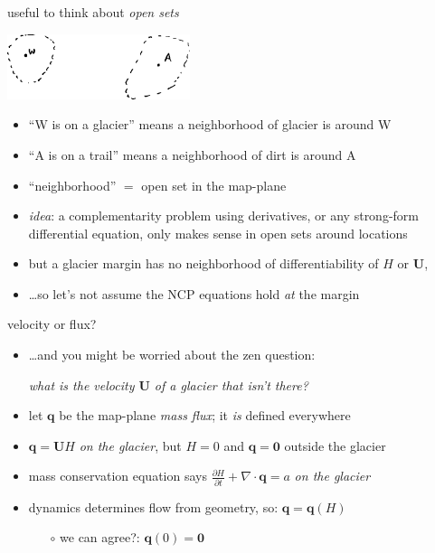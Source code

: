 \documentclass[10pt,hyperref,dvipsnames]{beamer}
\newcommand{\bq}{\mathbf{q}}
\newcommand{\bU}{\mathbf{U}}
\newcommand{\bzero}{\bm{0}}
\newcommand{\Div}{\nabla\cdot}
\begin{document}
\begin{frame}{useful to think about \emph{open sets}}

\begin{center}
\includegraphics[width=0.4\textwidth]{figs/opensets.png}
\end{center}

\begin{itemize}
\item ``W is on a glacier'' means a neighborhood of glacier is around W
\item ``A is on a trail'' means a neighborhood of dirt is around A
\item ``neighborhood'' $=$ open set in the map-plane

\medskip
\item \emph{idea}:  a complementarity problem using derivatives, or any strong-form differential equation, only makes sense in open sets around locations

\medskip
\item but a glacier margin has no neighborhood of differentiability of $H$ or $\bU$,
\item \dots so let's not assume the NCP equations hold \emph{at} the margin
\end{itemize}
\end{frame}


\begin{frame}{velocity or flux?}
\begin{itemize}
\item \dots and you might be worried about the zen question:

\begin{center}
\emph{what is the velocity $\bU$ of a glacier that isn't there?}
\end{center}

\vspace{5mm}
\item<2> let $\bq$ be the map-plane \emph{mass flux}; it \emph{is} defined everywhere

\medskip
\item<2> \alert{$\bq = \bU H$ \emph{on the glacier}, but $H=0$ and $\bq=\bzero$ outside the glacier}

\medskip
\item<2> mass conservation equation says \quad $\frac{\partial H}{\partial t} + \Div \bq = a$ \quad \emph{on the glacier}

\medskip
\item<2> dynamics determines flow from geometry, so: \quad $\bq=\bq(H)$
    \begin{itemize}
    \item[$\circ$] we can agree?: \quad $\bq(0)=\bzero$
    \end{itemize}
\end{itemize}
\end{frame}
\end{document}
